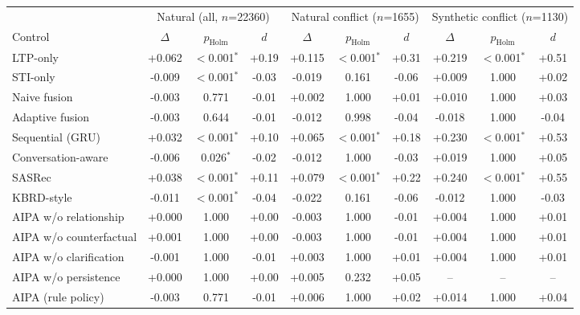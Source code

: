 \begin{tabular}{l ccc ccc ccc}
\toprule
& \multicolumn{3}{c}{Natural (all, $n$=22360)} & \multicolumn{3}{c}{Natural conflict ($n$=1655)} & \multicolumn{3}{c}{Synthetic conflict ($n$=1130)} \\
\cmidrule(lr){2-4}\cmidrule(lr){5-7}\cmidrule(lr){8-10}
Control & $\Delta$ & $p_{\text{Holm}}$ & $d$ & $\Delta$ & $p_{\text{Holm}}$ & $d$ & $\Delta$ & $p_{\text{Holm}}$ & $d$ \\
\midrule
LTP-only & +0.062 & $<$0.001$^{*}$ & +0.19 & +0.115 & $<$0.001$^{*}$ & +0.31 & +0.219 & $<$0.001$^{*}$ & +0.51 \\
STI-only & -0.009 & $<$0.001$^{*}$ & -0.03 & -0.019 & 0.161 & -0.06 & +0.009 & 1.000 & +0.02 \\
Naive fusion & -0.003 & 0.771 & -0.01 & +0.002 & 1.000 & +0.01 & +0.010 & 1.000 & +0.03 \\
Adaptive fusion & -0.003 & 0.644 & -0.01 & -0.012 & 0.998 & -0.04 & -0.018 & 1.000 & -0.04 \\
Sequential (GRU) & +0.032 & $<$0.001$^{*}$ & +0.10 & +0.065 & $<$0.001$^{*}$ & +0.18 & +0.230 & $<$0.001$^{*}$ & +0.53 \\
Conversation-aware & -0.006 & 0.026$^{*}$ & -0.02 & -0.012 & 1.000 & -0.03 & +0.019 & 1.000 & +0.05 \\
SASRec & +0.038 & $<$0.001$^{*}$ & +0.11 & +0.079 & $<$0.001$^{*}$ & +0.22 & +0.240 & $<$0.001$^{*}$ & +0.55 \\
KBRD-style & -0.011 & $<$0.001$^{*}$ & -0.04 & -0.022 & 0.161 & -0.06 & -0.012 & 1.000 & -0.03 \\
\midrule
AIPA w/o relationship & +0.000 & 1.000 & +0.00 & -0.003 & 1.000 & -0.01 & +0.004 & 1.000 & +0.01 \\
AIPA w/o counterfactual & +0.001 & 1.000 & +0.00 & -0.003 & 1.000 & -0.01 & +0.004 & 1.000 & +0.01 \\
AIPA w/o clarification & -0.001 & 1.000 & -0.01 & +0.003 & 1.000 & +0.01 & +0.004 & 1.000 & +0.01 \\
AIPA w/o persistence & +0.000 & 1.000 & +0.00 & +0.005 & 0.232 & +0.05 & -- & -- & -- \\
AIPA (rule policy) & -0.003 & 0.771 & -0.01 & +0.006 & 1.000 & +0.02 & +0.014 & 1.000 & +0.04 \\
\bottomrule
\end{tabular}
